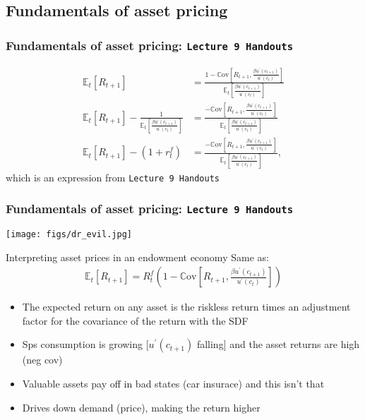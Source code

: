 \documentclass[presentation,dvipsnames]{beamer}
\begin{document}
\subsection{Fundamentals of asset pricing}

\begin{frame}
\frametitle{Fundamentals of asset pricing: \texttt{Lecture 9 Handouts}}
\begin{align*}
\mathbb{E}_{t} \left[ R_{t+1} \right] &=
\frac{1 - \mathbb{C} \text{ov} \left[ R_{t+1}, \frac{\beta u^{\prime}(c_{t+1})}{u^{\prime}(c_{t})} \right]}{
  \mathbb{E}_{t} \left[ \frac{\beta u^{\prime}(c_{t+1})}{u^{\prime}(c_{t})} \right]} \\
\mathbb{E}_{t} \left[ R_{t+1} \right] - \frac{1}{\mathbb{E}_{t} \left[ \frac{\beta u^{\prime}(c_{t+1})}{u^{\prime}(c_{t})} \right]} &=
\frac{- \mathbb{C} \text{ov} \left[ R_{t+1}, \frac{\beta u^{\prime}(c_{t+1})}{u^{\prime}(c_{t})} \right]}{
  \mathbb{E}_{t} \left[ \frac{\beta u^{\prime}(c_{t+1})}{u^{\prime}(c_{t})} \right]} \\
\mathbb{E}_{t} \left[ R_{t+1} \right] - (1+r_{t}^{f}) &= \frac{- \mathbb{C} \text{ov} \left[ R_{t+1}, \frac{\beta u^{\prime}(c_{t+1})}{u^{\prime}(c_{t})} \right]}{
  \mathbb{E}_{t} \left[ \frac{\beta u^{\prime}(c_{t+1})}{u^{\prime}(c_{t})} \right]},
\end{align*}
which is an expression from \texttt{Lecture 9 Handouts}
\end{frame}

\begin{frame}
\frametitle{Fundamentals of asset pricing: \texttt{Lecture 9 Handouts}}
\centerline{\texttt{[image: figs/dr\_evil.jpg]}}
\end{frame}

\begin{frame}[label=sec-4-5]{Interpreting asset prices in an endowment economy}
Same as:
\begin{align*}
\mathbb{E}_{t} \left[ R_{t+1} \right] = R^{f}_{t} \left( 1 - \mathbb{C} \text{ov} \left[ R_{t+1}, \frac{\beta u^{\prime}(c_{t+1})}{u^{\prime}(c_{t})} \right] \right)
\end{align*}

\begin{itemize}[label={--}]
\item The expected return on any asset is the riskless return times an adjustment factor for the covariance of the return with the SDF
\item Sps consumption is growing [$u^{\prime}(c_{t+1})$ falling] and the asset returns are high (neg cov)
\item Valuable assets pay off in bad states (car insurace) and this isn't that
\item Drives down demand (price), making the return higher
\end{itemize}
\end{frame}
\end{document}
